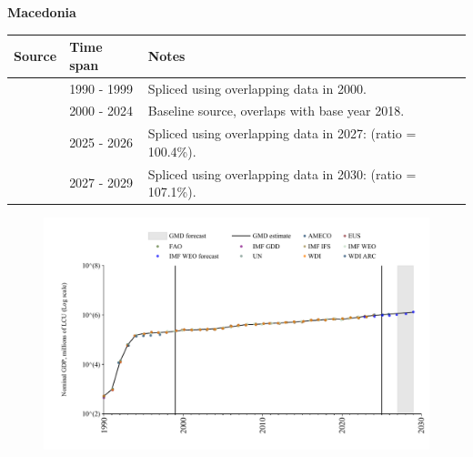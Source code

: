 \documentclass[12pt,a4paper,landscape]{article}
\begin{document}
\begin{adjustbox}{max totalsize={\paperwidth}{\paperheight},center}
\begin{minipage}[t][\textheight][t]{\textwidth}
\vspace*{0.5cm}
{}
\begin{center}
{\Large\bfseries Macedonia}
\end{center}
\vspace{0.5cm}
\begin{table}[H]
\centering
\small
\begin{tabular}{|l|l|l|}
\hline
\textbf{Source} & \textbf{Time span} & \textbf{Notes} \\
\hline
\rowcolor{white}\cite{AMECO}& 1990 - 1999 &Spliced using overlapping data in 2000.\\
\rowcolor{lightgray}\cite{EUS}& 2000 - 2024 &Baseline source, overlaps with base year 2018.\\
\rowcolor{white}\cite{AMECO}& 2025 - 2026 &Spliced using overlapping data in 2027: (ratio = 100.4\%).\\
\rowcolor{lightgray}\cite{IMF_WEO_forecast}& 2027 - 2029 &Spliced using overlapping data in 2030: (ratio = 107.1\%).\\
\hline
\end{tabular}
\end{table}
\begin{figure}[H]
\centering
\includegraphics[width=\textwidth,height=0.6\textheight,keepaspectratio]{graphs/MKD_nGDP.pdf}
\end{figure}
\end{minipage}
\end{adjustbox}
\end{document}
